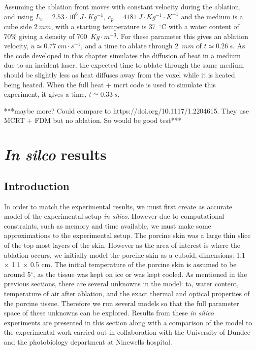 Assuming the ablation front moves with constant velocity during the ablation, and using $L_v=2.53\cdot 10^6\ J\cdot Kg^{-1},\ c_p=4181\ J\cdot Kg^{-1}\cdot K^{-1}$ and the medium is a cube side $2\ mm$, with a starting temperature is 37~$^{\circ}$C with a water content of 70\% giving a density of 700~$Kg\cdot m^{-3}$. For these parameter this gives an ablation velocity, $u\simeq 0.77\ cm\cdot s^{-1}$, and a time to ablate through 2~$mm$ of $t \simeq 0.26~s$.
As the code developed in this chapter simulates the diffusion of heat in a medium due to an incident laser, the expected time to ablate through the same medium should be slightly less as heat diffuses away from the voxel while it is heated being heated. When the full heat + \gls{mcrt} code is used to simulate this experiment, it gives a time, $t \simeq 0.33~s$.	

\medskip

***maybe more? Could compare to https://doi.org/10.1117/1.2204615. They use MCRT + FDM but no ablation. So would be good test***


\section{\textit{In silco} results} 

\subsection{Introduction}

In order to match the experimental results, we must first create as accurate model of the experimental setup \textit{in silico}. However due to computational constraints, such as memory and time available, we must make some approximations to the experimental setup. The porcine skin was a large thin slice of the top most layers of the skin. However as the area of interest is where the ablation occurs, we initially  model the porcine skin as a cuboid, dimensions:  1.1 $\times$ 1.1 $\times$ 0.5 cm. The initial temperature of the porcine skin is assumed to be around 5$^{\circ}$, as the tissue was kept on ice or was kept cooled. 
As mentioned in the previous sections, there are several unknowns in the model: \gls{ta}, water content, temperature of air after ablation, and the exact thermal and optical properties of the porcine tissue. Therefore we run several models so that the full parameter space of these unknowns can be explored.
Results from these \textit{in silico} experiments are presented in this section along with a comparison of the model to the experimental work carried out in collaboration with the University of Dundee and the photobiology department at Ninewells hospital.


